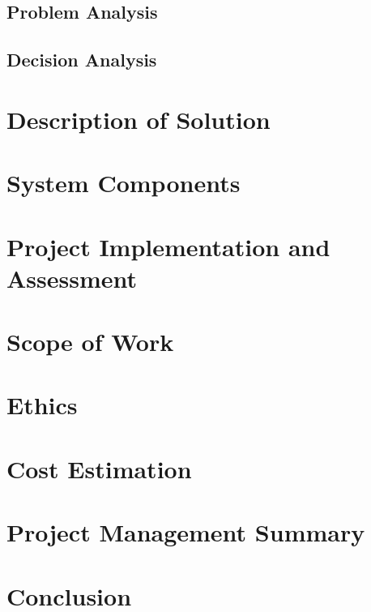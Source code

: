 \documentclass[letterpaper,12pt]{article}
\begin{document}
\subsection{Problem Analysis}
\subsection{Decision Analysis}

\section{Description of Solution}

\section{System Components}

\section{Project Implementation and Assessment}
\section{Scope of Work}
\section{Ethics}
\section{Cost Estimation}
\section{Project Management Summary}
\section{Conclusion}
\end{document}
